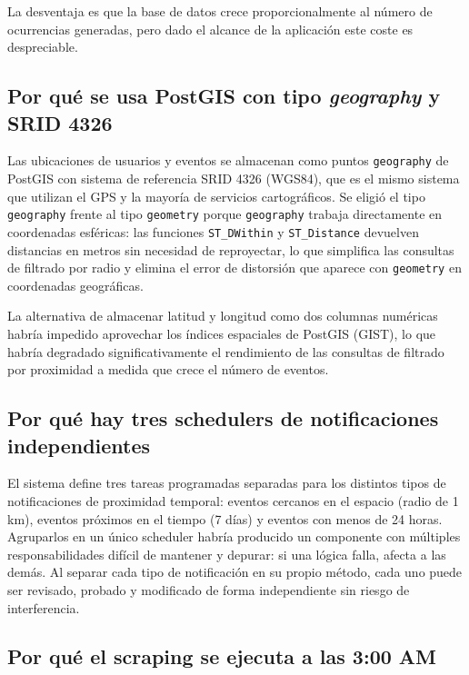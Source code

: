 La desventaja es que la base de datos crece proporcionalmente al número de ocurrencias generadas, pero dado el alcance de la aplicación este coste es despreciable.

\subsection{Por qué se usa PostGIS con tipo \textit{geography} y SRID 4326}

Las ubicaciones de usuarios y eventos se almacenan como puntos \texttt{geography} de PostGIS con sistema de referencia SRID 4326 (WGS84), que es el mismo sistema que utilizan el GPS y la mayoría de servicios cartográficos. Se eligió el tipo \texttt{geography} frente al tipo \texttt{geometry} porque \texttt{geography} trabaja directamente en coordenadas esféricas: las funciones \texttt{ST\_DWithin} y \texttt{ST\_Distance} devuelven distancias en metros sin necesidad de reproyectar, lo que simplifica las consultas de filtrado por radio y elimina el error de distorsión que aparece con \texttt{geometry} en coordenadas geográficas.

La alternativa de almacenar latitud y longitud como dos columnas numéricas habría impedido aprovechar los índices espaciales de PostGIS (GIST), lo que habría degradado significativamente el rendimiento de las consultas de filtrado por proximidad a medida que crece el número de eventos.


\subsection{Por qué hay tres schedulers de notificaciones independientes}

El sistema define tres tareas programadas separadas para los distintos tipos de notificaciones de proximidad temporal: eventos cercanos en el espacio (radio de 1 km), eventos próximos en el tiempo (7 días) y eventos con menos de 24 horas. Agruparlos en un único scheduler habría producido un componente con múltiples responsabilidades difícil de mantener y depurar: si una lógica falla, afecta a las demás. Al separar cada tipo de notificación en su propio método, cada uno puede ser revisado, probado y modificado de forma independiente sin riesgo de interferencia.

\subsection{Por qué el scraping se ejecuta a las 3:00 AM}

